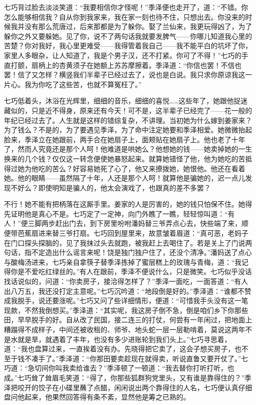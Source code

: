 \par 七巧背过脸去淡淡笑道：“我要相信你才怪呢！”季泽便也走开了，道：“不错。你怎么能够相信我？自从你到我家来，我在家一刻也待不住，只想出去。你没来的时候我并没有那么荒唐过，后来那都是为了躲你。娶了兰仙来，我更玩得凶了，为了躲你之外又要躲她。见了你，说不了两句话我就要发脾气——你哪儿知道我心里的苦楚？你对我好，我心里更难受——我得管着我自己——我不能平白的坑坏了你，家里人多眼杂，让人知道了，我是个男子汉，还不打紧。你可了不得！”七巧的手直打颤，扇柄上的杏黄须子在她额上苏苏摩擦着。季泽道：“你信也罢！不信也罢！信了又怎样？横竖我们半辈子已经过去了，说也是白说。我只求你原谅我这一片心。我为你吃了这些苦，也就不算冤枉了。”
\par 七巧低着头，沐浴在光辉里，细细的音乐，细细的喜悦……这些年了，她跟他捉迷藏似的，只是近不得身，原来还有今天！可不是，这半辈子已经完了——花一般的年纪已经过去了。人生就是这样的错综复杂，不讲理。当初她为什么嫁到姜家来？为了钱么？不是的，为了要遇见季泽，为了命中注定她要和季泽相爱。她微微抬起脸来，季泽立在她跟前，两手合在她扇子上，面颊贴在她扇子上。他也老了十年了，然而人究竟还是那个人呵！他难道是哄她么？他想她的钱——她卖掉她的一生换来的几个钱？仅仅这一转念便使她暴怒起来。就算她错怪了他，他为她吃的苦抵得过她为他吃的苦么？好容易她死了心了，他又来撩拨她，她恨他。他还在看着她。他的眼睛——虽然隔了十年，人还是那个人呵！就算他是骗她的，迟一点儿发现不好么？即使明知是骗人的，他太会演戏了，也跟真的差不多罢？
\par 不行！她不能有把柄落在这厮手里。姜家的人是厉害的，她的钱只怕保不住。她得先证明他是真心不是。七巧定了一定神，向门外瞧了一瞧，轻轻惊叫道：“有人！”便三脚两步赶出门去，到下房里吩咐潘妈替三爷弄点心去，快些端了来，顺便带芭蕉扇进来替三爷打扇。七巧回到屋里来，故意皱着眉道：“真可恶，老妈子在门口探头探脑的，见了我抹过头去就跑，被我赶上去喝住了。若是关上了门说两句话，指不定造出什么谣言来呢！饶是独门独户住了，还没个清净。”潘妈送了点心与酸梅汤进来，七巧亲自拿筷子替季泽拣掉了蜜层糕上的玫瑰与青梅，道：“我记得你是不爱吃红绿丝的。”有人在跟前，季泽不便说什么，只是微笑。七巧似乎没话找话说似的，问道：“你卖房子，接洽得怎样了？”季泽一面吃，一面答道：“有人出八万五，我还没打定主意呢。”七巧沉吟道：“地段倒是好的。”季泽道：“谁都不赞成我脱手，说还要涨呢。”七巧又问了些详细情形，便道：“可惜我手头没有这一笔现款，不然我倒想买。”季泽道：“其实呢，我这房子倒不急，倒是咱们乡下你那些田，早早脱手的好。自从改了民国，接二连三的打仗，何尝有一年闲过，把地面上糟蹋得不成样子，中间还被收租的、师爷、地头蛇一层一层勒啃着，莫说这两年不是水就是旱，就遇着了丰年，也没有多少进账轮到我们头上。”七巧寻思着，道：“我也盘算过来，一直挨着没有办。先晓得把它卖了，这会子想买房子，也不至于钱不凑手了。”季泽道：“你那田要卖趁现在就得卖，听说直鲁又要开仗了。”七巧道：“急切间你叫我卖给谁去？”季泽顿了一顿道：“我去替你打听打听，也成。”七巧耸了耸眉毛笑道：“得了，你那些狐群狗党里头，又有谁是靠得住的？”季泽把咬开的饺子在小碟里蘸了点醋，闲闲说出两个靠得住的人名，七巧便认真仔细盘问他起来，他果然回答得有条不紊，显然他是筹之已熟的。
